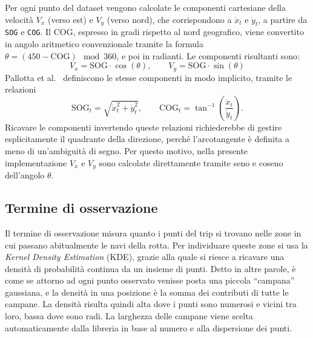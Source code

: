 Per ogni punto del dataset vengono calcolate le componenti cartesiane della velocità $V_x$ (verso est)
e $V_y$ (verso nord), che corrispondono a $\dot{x}_t$ e $\dot{y}_t$, a partire da \texttt{SOG} e
\texttt{COG}. Il COG, espresso in gradi rispetto al
nord geografico, viene convertito in angolo aritmetico convenzionale
tramite la formula $\theta = (450 - \text{COG}) \mod 360$, e poi in radianti. Le componenti
risultanti sono:
\[
V_x = \text{SOG} \cdot \cos(\theta), \qquad V_y = \text{SOG} \cdot \sin(\theta)
\]
Pallotta et al.\ \cite{pallotta} definiscono le stesse componenti in modo implicito, tramite le relazioni
\[
    \text{SOG}_t = \sqrt{\dot{x}_t^2 + \dot{y}_t^2}, \qquad
    \text{COG}_t = \tan^{-1}\!\left(\frac{\dot{x}_t}{\dot{y}_t}\right) .
\]
Ricavare le componenti invertendo queste relazioni richiederebbe di gestire esplicitamente il
quadrante della direzione, perché l'arcotangente è definita a meno di un'ambiguità di segno.
Per questo motivo, nella presente implementazione $V_x$ e $V_y$ sono calcolate direttamente
tramite seno e coseno dell'angolo $\theta$.

\subsection{Termine di osservazione}\label{ssec:meth_kde}

Il termine di osservazione misura quanto i punti del trip si trovano nelle zone in cui passano
abitualmente le navi della rotta. Per individuare queste zone si usa la \emph{Kernel Density Estimation}
(KDE), grazie alla quale si riesce a ricavare una densità di probabilità continua da un insieme di punti. 
Detto in altre parole, è come se attorno ad ogni punto osservato venisse posta una piccola ``campana'' gaussiana,
 e la densità in una posizione è la somma dei contributi di tutte le campane. 
La densità risulta quindi alta dove i punti sono numerosi e vicini
tra loro, bassa dove sono radi. La larghezza delle campane viene scelta automaticamente dalla libreria
in base al numero e alla dispersione dei punti.

